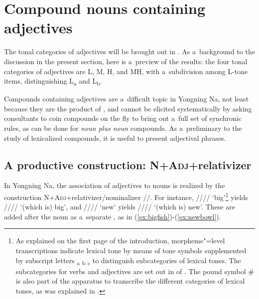 \section{Compound nouns containing adjectives}
\label{sec:compoundnounscontainingadjectives}

The tonal categories of adjectives will be brought out in . As a~background to the discussion in the present section, here is a~preview of the results: the four tonal categories of adjectives are L, M, H, and MH, with a~subdivision among L-tone items, distinguishing L\textsubscript{a} and L\textsubscript{b}.

{\largerpage} %

Compounds containing adjectives are a~difficult topic in Yongning Na, not least because they are the product of , and cannot be elicited systematically by asking consultants to coin compounds on the fly to bring out a~full set of synchronic rules, as can be done for \textit{noun plus noun} compounds. As a~preliminary to the study of lexicalized compounds, it is useful to present adjectival phrases.

\subsection{A productive construction: \textsc{N}+\textsc{Adj}+{relativizer}}
\label{sec:productiveconstruction}

%
%

In Yongning Na, the association of adjectives to nouns is realized by
the construction \textsc{N}+\textsc{Adj}+{relativizer}/{nominalizer}
\mbox{//}. For instance, //// ‘big’\footnote{As explained on the first page of the introduction, morpheme"=level transcriptions indicate lexical tone by means of tone symbols supplemented by
	subscript letters \textsubscript{a} \textsubscript{b} \textsubscript{c} to distinguish subcategories of lexical tones. The {subcategories} for verbs and adjectives are set out in  of . The pound symbol \# is also part of the apparatus to transcribe the different categories of lexical tones, as was explained in .} yields //// ‘(which is) big’, and //// ‘new’ yields //// ‘(which is) new’. These are added after the noun as
a~separate , as in (\ref{ex:bigfish})-(\ref{ex:newbowl}).

